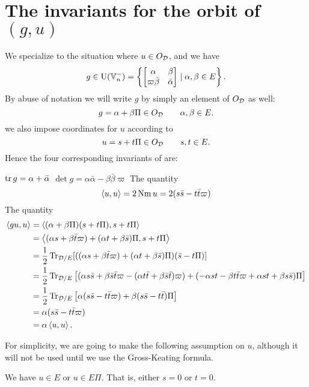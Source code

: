 \section{The invariants for the orbit of $(g,u)$}
\label{sec:g_u_invariants}
We specialize to the situation where $u \in O_\mathcal D$, and we have
\[ g \in \operatorname{U}(\mathbb V_n^-) = \left\{
    \begin{bmatrix} \alpha & \beta \\ \varpi\bar\beta & \bar\alpha \end{bmatrix}
    \mid \alpha, \beta \in E \right\}. \]
By abuse of notation we will write $g$ by simply an element of $O_\mathcal D$ as well:
\[ g = \alpha + \beta \Pi \in O_\mathcal D \qquad \alpha, \beta \in E. \]
we also impose coordinates for $u$ according to
\[ u = s + t \Pi \in O_\mathcal D \qquad s, t \in E. \]
Hence the four corresponding invariants of  are:
\begin{itemize}
  \ii $\operatorname{tr} g = \alpha + \bar\alpha$
  \ii $\det g = \alpha \bar \alpha - \beta \bar\beta \varpi$
  \ii The quantity
  \[ \left\langle u,u \right\rangle = 2 \operatorname{Nm} u = 2(s \bar s - t \bar t \varpi) \]
  \ii The quantity
  \begin{align*}
    \left\langle gu, u \right\rangle
    &= \left\langle (\alpha + \beta \Pi)(s + t \Pi), s + t \Pi \right\rangle \\
    &= \left\langle (\alpha s + \beta \bar t \varpi) + (\alpha t + \beta \bar s) \Pi,
      s + t \Pi \right\rangle \\
    &= \frac{1}{2} \operatorname{Tr}_{\mathcal D/E} [((\alpha s + \beta \bar t \varpi) + (\alpha t + \beta \bar s) \Pi) (\bar s - t \Pi)] \\
    &= \frac{1}{2} \operatorname{Tr}_{\mathcal D/E} \left[
      (\alpha s \bar s + \beta \bar s \bar t \varpi
      - (\alpha t \bar t + \beta \bar s \bar t) \varpi)
      + (-\alpha s t - \beta t \bar t \varpi + \alpha s t + \beta s \bar s) \Pi
    \right] \\
    &= \frac{1}{2} \operatorname{Tr}_{\mathcal D/E} \left[
      \alpha (s \bar s - t \bar t \varpi)
      + \beta(s \bar s - t \bar t) \Pi \right] \\
    &= \alpha (s \bar s - t \bar t \varpi) \\
    &= \alpha \left\langle u,u \right\rangle.
  \end{align*}
\end{itemize}

For simplicity, we are going to make the following assumption on $u$,
although it will not be used until we use the Gross-Keating formula.
\begin{assume}
  We have $u \in E$ or $u \in E \Pi$.
  That is, either $s = 0$ or $t = 0$.
  \label{assume:st_zero}
\end{assume}

